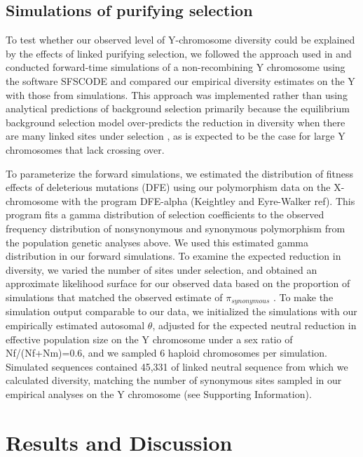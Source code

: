 \documentclass[9pt,twocolumn,twoside]{gsajnl}
\begin{document}
\subsection*{Simulations of purifying selection}
To test whether our observed level of Y-chromosome diversity could be explained by the effects of linked purifying selection, we followed the approach used in \citep{Wilsonsayres2014} and conducted forward-time simulations of a non-recombining Y chromosome using the software SFSCODE \citep{hernandez2008flexible} and compared our empirical diversity estimates on the Y with those from simulations. This approach was implemented rather than using analytical predictions of background selection primarily because the equilibrium background selection model over-predicts the reduction in diversity when there are many linked sites under selection \citep{KaiserCharlesworth}, as is expected to be the case for large Y chromosomes that lack crossing over.

To parameterize the forward simulations, we estimated the distribution of fitness effects of deleterious mutations (DFE) using our polymorphism data on the X-chromosome with the program DFE-alpha (Keightley and Eyre-Walker ref). This program fits a gamma distribution of selection coefficients to the observed frequency distribution of nonsynonymous and synonymous polymorphism from the population genetic analyses above. We used this estimated gamma distribution in our forward simulations. To examine the expected reduction in diversity, we varied the number of sites under selection, and obtained an approximate likelihood surface for our observed data based on the proportion of simulations that matched the observed estimate of $\pi_{synonymous}$ . To make the simulation output comparable to our data, we initialized the simulations with our empirically estimated autosomal $\theta$, adjusted for the expected neutral reduction in effective population size on the Y chromosome under a sex ratio of Nf/(Nf+Nm)=0.6, and we sampled 6 haploid chromosomes per simulation. Simulated sequences contained 45,331 of linked neutral sequence from which we calculated diversity, matching the number of synonymous sites sampled in our empirical analyses on the Y chromosome (see Supporting Information).



\section*{Results and Discussion}
\end{document}
